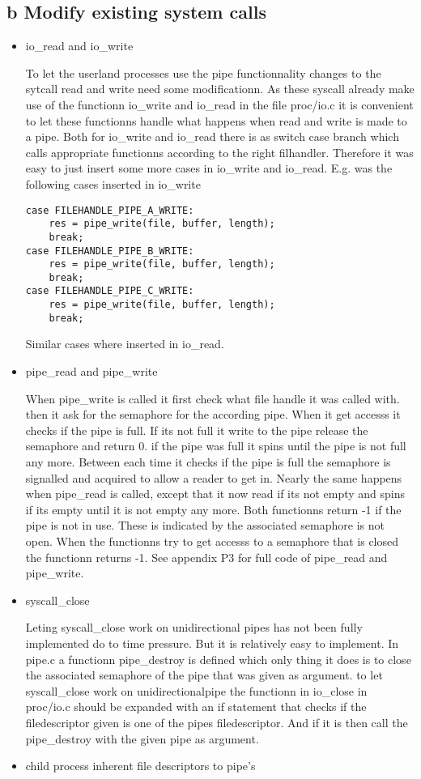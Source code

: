 \documentclass[a4paper,12pt,danish]{report}
\begin{document}
\subsection{b Modify existing system calls}
\begin{itemize}
  \item{io\_read and io\_write}

	To let the userland processes use the pipe functionnality changes
	to the sytcall read and write need some modificationn. As these syscall already make use of the
	functionn io\_write and io\_read in the file proc/io.c it is convenient to
	let these functionns handle what happens when read and write is made to a pipe.
	Both for io\_write and io\_read there is as switch case branch which calls
	appropriate functionns according to the right filhandler. Therefore it was easy
	to just insert some more cases in io\_write and io\_read. E.g. was the following
	cases inserted in io\_write
	\begin{verbatim}
case FILEHANDLE_PIPE_A_WRITE:
    res = pipe_write(file, buffer, length);
    break;
case FILEHANDLE_PIPE_B_WRITE:
    res = pipe_write(file, buffer, length);
    break;
case FILEHANDLE_PIPE_C_WRITE:
    res = pipe_write(file, buffer, length);
    break;
	\end{verbatim}
	Similar cases where inserted in io\_read.
  \item{pipe\_read and pipe\_write}

	When pipe\_write is called it first check what file handle it was called with.
	then it ask for the semaphore for the according pipe. When it get accesss it
	checks if the pipe is full. If its not full it write to the pipe release the
	semaphore and return 0. if the pipe was full it spins until the pipe is
	not full any more. Between each time it checks if the pipe is full the
	semaphore is signalled and acquired to allow a reader to get in. Nearly the same
	happens when pipe\_read is called, except that it now read if its not empty and
	spins if its empty until it is not empty any more. Both functionns return -1
	if the pipe is not in use. These is indicated by the associated semaphore is
	not open. When the functionns try to get accesss to a semaphore that is
	closed the functionn returns -1.
	See appendix P3 for full code of pipe\_read
	and pipe\_write.
  \item{syscall\_close}
  
  	Leting syscall\_close work on unidirectional pipes has not been fully
  	implemented do to time pressure. But it is relatively easy to implement. In
  	pipe.c a functionn pipe\_destroy is defined which only thing it does is to
  	close the associated semaphore of the pipe that was given as argument.
  	to let syscall\_close work on unidirectionalpipe the functionn in io\_close
  	in proc/io.c should be expanded with an if statement that checks if the
  	filedescriptor given is one of the pipes filedescriptor. And if it is then
  	call the pipe\_destroy with the given pipe as argument.
  	\item{child process inherent file descriptors to pipe's}


\end{itemize}
\end{document}
